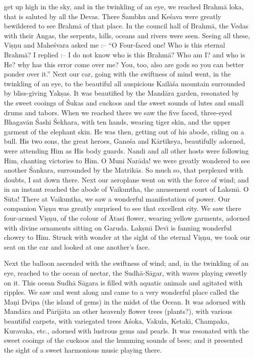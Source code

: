 get up high in the sky, and in the twinkling of an eye, we reached Brahm\=a loka, that is saluted by all the Devas. There \'Sambhu and Ke\'sava were greatly bewildered to see Brahm\=a of that place. In the council hall of Brahm\=a, the Vedas with their Angas, the serpents, hills, oceans and rivers were seen. Seeing all these, Vi\d{s}\d{n}u and Mahe\'svara asked me :-- ``O Four-faced one! Who is this eternal Brahm\=a? I replied :-- I do not know who is this Brahm\=a? Who am I? and who is He? why has this error come over me? You, too, also are gods so you can better ponder over it.'' Next our car, going with the swiftness of mind went, in the twinkling of an eye, to the beautiful all auspicious Kail\=a\'sa mountain surrounded by bliss-giving Yak\d{s}as. It was beautified by the Mand\=ara garden, resonated by the sweet cooings of \'Sukas and cuckoos and the sweet sounds of lutes and small drums and tabors. When we reached there we saw the five faced, three-eyed Bhagav\=an \'Sashi \'Sekhara, with ten hands, wearing tiger skin, and the upper garment of the elephant skin. He was then, getting out of his abode, riding on a bull. His two sons, the great heroes, Gane\'sa and K\=artikeya, beautifully adorned, were attending Him as His body guards. Nandi and all other hosts were following Him, chanting victories to Him. O Muni Nar\=ada! we were greatly wondered to see another \'Sankara, surrounded by the Matrik\=as. So much so, that perplexed with doubts, I sat down there. Next our aeroplane went on with the force of wind; and in an instant reached the abode of Vaikuntha, the amusement court of Laksm\={\i}. O S\=uta! There at Vaikuntha, we saw a wonderful manifestation of power. Our companion Vi\d{s}\d{n}u was greatly surprised to see that excellent city. We saw there four-armed Vi\d{s}\d{n}u, of the colour of \=Atasi flower, wearing yellow garments, adorned with divine ornaments sitting on Garuda. Lak\d{s}m\={\i} Dev\={\i} is fanning wonderful chowry to Him. Struck with wonder at the sight of the eternal Vi\d{s}\d{n}u, we took our seat on the car and looked at one another's face.

Next the balloon ascended with the swiftness of wind; and, in the twinkling of an eye, reached to the ocean of nectar, the Sudh\=a-S\=agar, with waves playing sweetly on it. This ocean Sudh\=a S\=agara is filled with aquatic animals and agitated with ripples. We saw and went along and came to a very wonderful place called the Ma\d{n}i Dv\={\i}pa (the island of gems) in the midst of the Ocean. It was adorned with Mand\=ara and P\=arij\=ata an other heavenly flower trees (plants?), with various beautiful carpets, with variegated trees A\'soka, Vakula, Ketak\={\i}, Champaka, Kuravaka, etc., adorned with lustrous gems and pearls. It was resonated with the sweet cooings of the cuckoos and the humming sounds of bees; and it presented the sight of a sweet harmonious music playing there.

